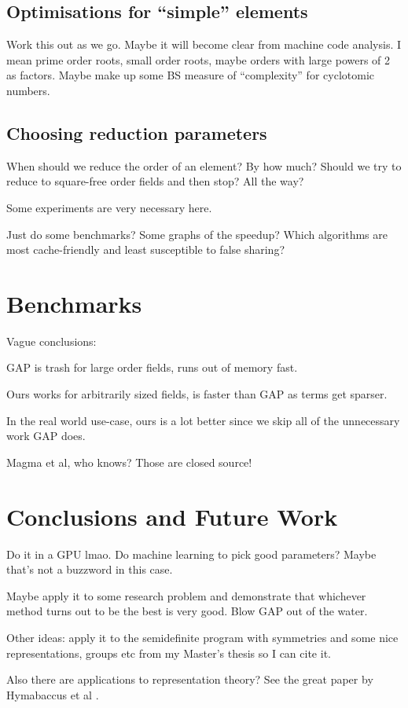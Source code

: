 \documentclass{article}
\begin{document}
\subsection{Optimisations for ``simple'' elements}

Work this out as we go. Maybe it will become clear from machine code
analysis. I mean prime order roots, small order roots, maybe orders
with large powers of 2 as factors. Maybe make up some BS measure of
``complexity'' for cyclotomic numbers.

\subsection{Choosing reduction parameters}

When should we reduce the order of an element? By how much? Should we
try to reduce to square-free order fields and then stop? All the way?

Some experiments are very necessary here.

Just do some benchmarks? Some graphs of the speedup? Which algorithms
are most cache-friendly and least susceptible to false sharing?

\section{Benchmarks}

Vague conclusions:

GAP is trash for large order fields, runs out of memory fast.

Ours works for arbitrarily sized fields, is faster than GAP as
terms get sparser.

In the real world use-case, ours is a lot better since we skip all of
the unnecessary work GAP does.

Magma et al, who knows? Those are closed source!

\section{Conclusions and Future Work}

Do it in a GPU lmao. Do machine learning to pick good parameters?
Maybe that's not a buzzword in this case.

Maybe apply it to some research problem and demonstrate that whichever
method turns out to be the best is very good. Blow GAP out of the
water.

Other ideas: apply it to the semidefinite program with symmetries and
some nice representations, groups etc from my Master's thesis so I can
cite it.

Also there are applications to representation theory? See the great
paper by Hymabaccus et al \cite{Hymabaccus2020}.



\end{document}
